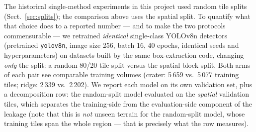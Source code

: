 The historical single-method experiments in this project used random tile splits (Sect.~\ref{sec:splits}); the comparison above uses the spatial split. To quantify what that choice does to a reported number --- and to make the two protocols commensurable --- we retrained \emph{identical} single-class YOLOv8n detectors (pretrained \texttt{yolov8n}, image size 256, batch 16, 40 epochs, identical seeds and hyperparameters) on datasets built by the same box-extraction code, changing \emph{only} the split: a random 80/20 tile split versus the spatial block split. Both arms of each pair see comparable training volumes (crater: 5\,659 vs.\ 5\,077 training tiles; ridge: 2\,339 vs.\ 2\,202). We report each model on its own validation set, plus a decomposition row: the random-split model evaluated on the \emph{spatial} validation tiles, which separates the training-side from the evaluation-side component of the leakage (note that this is \emph{not} unseen terrain for the random-split model, whose training tiles span the whole region --- that is precisely what the row measures).

\begin{table}[htbp]
\centering
\caption{Split-protocol study: identical YOLOv8n detectors, identical budget (40 epochs), different train/validation split. ``Random $\to$ spatial'' evaluates the random-split model on the spatial validation tiles, isolating the training-side component of the leakage.}
\label{tab:split_study}
\end{table}

